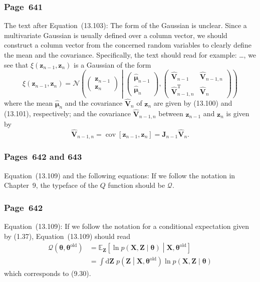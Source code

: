 \documentclass[12pt,a4paper]{article}
\newcommand{\erratum}[1]{\subsubsection*{#1}}
\begin{document}
\erratum{Page~641}
The text after Equation~(13.103):
The form of the Gaussian is unclear.
Since a multivariate Gaussian is usually defined over a column vector,
we should construct a column vector from the concerned random variables to clearly define the mean
and the covariance.
Specifically, the text should read for example:
\dots, we see that $\xi(\mathbf{z}_{n-1}, \mathbf{z}_{n})$ is a Gaussian of the form
\begin{equation}
\xi(\mathbf{z}_{n-1}, \mathbf{z}_{n}) =
  \mathcal{N}\left(
    \begin{pmatrix}
      \mathbf{z}_{n-1} \\
      \mathbf{z}_{n}
    \end{pmatrix}
  \middle|
    \begin{pmatrix}
    \hat{\bm{\mu}}_{n-1} \\
    \hat{\bm{\mu}}_{n}
    \end{pmatrix},
    \begin{pmatrix}
      \hat{\mathbf{V}}_{n-1} & \hat{\mathbf{V}}_{n-1, n} \\
      \hat{\mathbf{V}}_{n-1, n}^{\operatorname{T}} & \hat{\mathbf{V}}_{n}
    \end{pmatrix}
  \right)
\end{equation}
where the mean $\hat{\bm{\mu}}_{n}$ and the covariance $\hat{\mathbf{V}}_{n}$ of
$\mathbf{z}_{n}$ are given by (13.100) and (13.101), respectively;
and the covariance $\hat{\mathbf{V}}_{n-1, n}$ between $\mathbf{z}_{n-1}$ and $\mathbf{z}_{n}$ 
is given by
\begin{equation}
\hat{\mathbf{V}}_{n-1, n}
  = \operatorname{cov}\left[\mathbf{z}_{n-1}, \mathbf{z}_{n}\right]
  = \mathbf{J}_{n-1}\hat{\mathbf{V}}_{n} .
\end{equation}

\erratum{Pages~642 and 643}
Equation~(13.109) and the following equations:
If we follow the notation in Chapter~9, the typeface of the $Q$ function should be $\mathcal{Q}$.

\erratum{Page~642}
Equation~(13.109):
If we follow the notation for a conditional expectation given by (1.37),
Equation~(13.109) should read
\begin{align}
\mathcal{Q}\left(\bm{\theta}, \bm{\theta}^{\text{old}}\right)
  &= \mathbb{E}_{\mathbf{Z}} \left[
       \ln p \left( \mathbf{X}, \mathbf{Z} \middle| \bm{\theta} \right) \middle|
       \mathbf{X}, \bm{\theta}^{\text{old}} \right] \\
  &= \int \! \mathrm{d}\mathbf{Z} \;
       p \left( \mathbf{Z} \middle| \mathbf{X}, \bm{\theta}^{\text{old}}\right)
       \ln p \left( \mathbf{X}, \mathbf{Z} \middle| \bm{\theta} \right)
\end{align}
which corresponds to (9.30).
\end{document}
